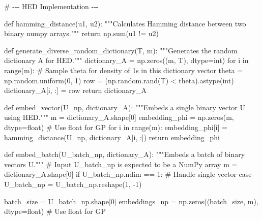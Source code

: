 \documentclass[
  letterpaper,
  DIV=11,
  numbers=noendperiod]{scrartcl}
\newenvironment{Shaded}{\begin{snugshade}}{\end{snugshade}}
\newcommand{\BuiltInTok}[1]{\textcolor[rgb]{0.00,0.23,0.31}{#1}}
\newcommand{\CommentTok}[1]{\textcolor[rgb]{0.37,0.37,0.37}{#1}}
\newcommand{\ControlFlowTok}[1]{\textcolor[rgb]{0.00,0.23,0.31}{#1}}
\newcommand{\DecValTok}[1]{\textcolor[rgb]{0.68,0.00,0.00}{#1}}
\newcommand{\KeywordTok}[1]{\textcolor[rgb]{0.00,0.23,0.31}{#1}}
\newcommand{\NormalTok}[1]{\textcolor[rgb]{0.00,0.23,0.31}{#1}}
\newcommand{\OperatorTok}[1]{\textcolor[rgb]{0.37,0.37,0.37}{#1}}
\begin{document}
\begin{Shaded}
\begin{Highlighting}[]
\CommentTok{\# {-}{-}{-} HED Implementation {-}{-}{-}}

\KeywordTok{def}\NormalTok{ hamming\_distance(u1, u2):}
    \CommentTok{"""Calculates Hamming distance between two binary numpy arrays."""}
    \ControlFlowTok{return}\NormalTok{ np.}\BuiltInTok{sum}\NormalTok{(u1 }\OperatorTok{!=}\NormalTok{ u2)}

\KeywordTok{def}\NormalTok{ generate\_diverse\_random\_dictionary(T, m):}
    \CommentTok{"""Generates the random dictionary A for HED."""}
\NormalTok{    dictionary\_A }\OperatorTok{=}\NormalTok{ np.zeros((m, T), dtype}\OperatorTok{=}\BuiltInTok{int}\NormalTok{)}
    \ControlFlowTok{for}\NormalTok{ i }\KeywordTok{in} \BuiltInTok{range}\NormalTok{(m):}
        \CommentTok{\# Sample theta for density of 1s in this dictionary vector}
\NormalTok{        theta }\OperatorTok{=}\NormalTok{ np.random.uniform(}\DecValTok{0}\NormalTok{, }\DecValTok{1}\NormalTok{)}
\NormalTok{        row }\OperatorTok{=}\NormalTok{ (np.random.rand(T) }\OperatorTok{\textless{}}\NormalTok{ theta).astype(}\BuiltInTok{int}\NormalTok{)}
\NormalTok{        dictionary\_A[i, :] }\OperatorTok{=}\NormalTok{ row}
    \ControlFlowTok{return}\NormalTok{ dictionary\_A}

\KeywordTok{def}\NormalTok{ embed\_vector(U\_np, dictionary\_A):}
    \CommentTok{"""Embeds a single binary vector U using HED."""}
\NormalTok{    m }\OperatorTok{=}\NormalTok{ dictionary\_A.shape[}\DecValTok{0}\NormalTok{]}
\NormalTok{    embedding\_phi }\OperatorTok{=}\NormalTok{ np.zeros(m, dtype}\OperatorTok{=}\BuiltInTok{float}\NormalTok{) }\CommentTok{\# Use float for GP}
    \ControlFlowTok{for}\NormalTok{ i }\KeywordTok{in} \BuiltInTok{range}\NormalTok{(m):}
\NormalTok{        embedding\_phi[i] }\OperatorTok{=}\NormalTok{ hamming\_distance(U\_np, dictionary\_A[i, :])}
    \ControlFlowTok{return}\NormalTok{ embedding\_phi}

\KeywordTok{def}\NormalTok{ embed\_batch(U\_batch\_np, dictionary\_A):}
    \CommentTok{"""Embeds a batch of binary vectors U."""}
    \CommentTok{\# Input U\_batch\_np is expected to be a NumPy array}
\NormalTok{    m }\OperatorTok{=}\NormalTok{ dictionary\_A.shape[}\DecValTok{0}\NormalTok{]}
    \ControlFlowTok{if}\NormalTok{ U\_batch\_np.ndim }\OperatorTok{==} \DecValTok{1}\NormalTok{: }\CommentTok{\# Handle single vector case}
\NormalTok{        U\_batch\_np }\OperatorTok{=}\NormalTok{ U\_batch\_np.reshape(}\DecValTok{1}\NormalTok{, }\OperatorTok{{-}}\DecValTok{1}\NormalTok{)}

\NormalTok{    batch\_size }\OperatorTok{=}\NormalTok{ U\_batch\_np.shape[}\DecValTok{0}\NormalTok{]}
\NormalTok{    embeddings\_np }\OperatorTok{=}\NormalTok{ np.zeros((batch\_size, m), dtype}\OperatorTok{=}\BuiltInTok{float}\NormalTok{) }\CommentTok{\# Use float for GP}


\end{Highlighting}
\end{Shaded}
\end{document}
